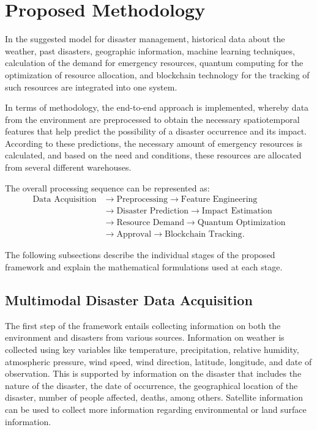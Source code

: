 \documentclass[conference]{IEEEtran}
\begin{document}
\section{Proposed Methodology}
In the suggested model for disaster management, historical data about the weather, past disasters, geographic information, machine learning techniques, calculation of the demand for emergency resources, quantum computing for the optimization of resource allocation, and blockchain technology for the tracking of such resources are integrated into one system.

In terms of methodology, the end-to-end approach is implemented, whereby data from the environment are preprocessed to obtain the necessary spatiotemporal features that help predict the possibility of a disaster occurrence and its impact. According to these predictions, the necessary amount of emergency resources is calculated, and based on the need and conditions, these resources are allocated from several different warehouses.

The overall processing sequence can be represented as:
\begin{equation}
\begin{aligned}
\text{Data Acquisition} &\longrightarrow \text{Preprocessing} \longrightarrow \text{Feature Engineering} \\
&\longrightarrow \text{Disaster Prediction} \longrightarrow \text{Impact Estimation} \\
&\longrightarrow \text{Resource Demand} \longrightarrow \text{Quantum Optimization} \\
&\longrightarrow \text{Approval} \longrightarrow \text{Blockchain Tracking}.
\end{aligned}
\label{eq:pipeline}
\end{equation}

The following subsections describe the individual stages of the proposed framework and explain the mathematical formulations used at each stage.

\subsection{Multimodal Disaster Data Acquisition}
The first step of the framework entails collecting information on both the environment and disasters from various sources. Information on weather is collected using key variables like temperature, precipitation, relative humidity, atmospheric pressure, wind speed, wind direction, latitude, longitude, and date of observation. This is supported by information on the disaster that includes the nature of the disaster, the date of occurrence, the geographical location of the disaster, number of people affected, deaths, among others. Satellite information can be used to collect more information regarding environmental or land surface information.
\end{document}
